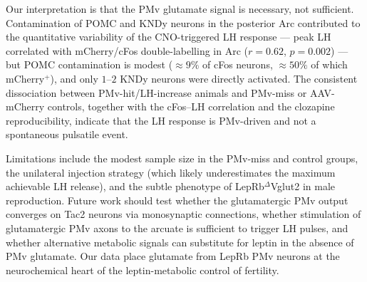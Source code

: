 \documentclass[11pt]{article}
\begin{document}
Our interpretation is that the PMv glutamate signal is necessary, not sufficient. Contamination of POMC \cite{manfredilozano2016} and KNDy \cite{cravo2013,donato2011,louis2011,true2011} neurons in the posterior Arc contributed to the quantitative variability of the CNO-triggered LH response --- peak LH correlated with mCherry/cFos double-labelling in Arc ($r = 0.62$, $p = 0.002$) --- but POMC contamination is modest ($\approx 9\%$ of cFos neurons, $\approx 50\%$ of which mCherry$^+$), and only $1$--$2$ KNDy neurons were directly activated. The consistent dissociation between PMv-hit/LH-increase animals and PMv-miss or AAV-mCherry controls, together with the cFos--LH correlation and the clozapine reproducibility, indicate that the LH response is PMv-driven and not a spontaneous pulsatile event.

Limitations include the modest sample size in the PMv-miss and control groups, the unilateral injection strategy (which likely underestimates the maximum achievable LH release), and the subtle phenotype of LepRb$^{\Delta}$Vglut2 in male reproduction. Future work should test whether the glutamatergic PMv output converges on Tac2 neurons via monosynaptic connections, whether stimulation of glutamatergic PMv axons to the arcuate is sufficient to trigger LH pulses, and whether alternative metabolic signals \cite{hill2010,hill2018} can substitute for leptin in the absence of PMv glutamate. Our data place glutamate from LepRb PMv neurons at the neurochemical heart of the leptin-metabolic control of fertility.



\end{document}
